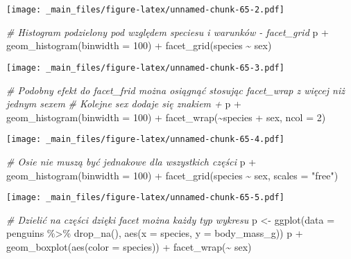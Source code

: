 \documentclass[
]{book}
\newenvironment{Shaded}{\begin{snugshade}}{\end{snugshade}}
\newcommand{\AttributeTok}[1]{\textcolor[rgb]{0.77,0.63,0.00}{#1}}
\newcommand{\CommentTok}[1]{\textcolor[rgb]{0.56,0.35,0.01}{\textit{#1}}}
\newcommand{\DecValTok}[1]{\textcolor[rgb]{0.00,0.00,0.81}{#1}}
\newcommand{\FunctionTok}[1]{\textcolor[rgb]{0.00,0.00,0.00}{#1}}
\newcommand{\NormalTok}[1]{#1}
\newcommand{\OtherTok}[1]{\textcolor[rgb]{0.56,0.35,0.01}{#1}}
\newcommand{\SpecialCharTok}[1]{\textcolor[rgb]{0.00,0.00,0.00}{#1}}
\newcommand{\StringTok}[1]{\textcolor[rgb]{0.31,0.60,0.02}{#1}}
\begin{document}
\texttt{[image: \_main\_files/figure-latex/unnamed-chunk-65-2.pdf]}

\begin{Shaded}
\begin{Highlighting}[]
\CommentTok{\# Histogram podzielony pod względem speciesu i warunków {-} facet\_grid}
\NormalTok{p }\SpecialCharTok{+} \FunctionTok{geom\_histogram}\NormalTok{(}\AttributeTok{binwidth =} \DecValTok{100}\NormalTok{) }\SpecialCharTok{+} \FunctionTok{facet\_grid}\NormalTok{(species }\SpecialCharTok{\textasciitilde{}}\NormalTok{ sex)}
\end{Highlighting}
\end{Shaded}

\texttt{[image: \_main\_files/figure-latex/unnamed-chunk-65-3.pdf]}

\begin{Shaded}
\begin{Highlighting}[]
\CommentTok{\# Podobny efekt do facet\_frid można osiągnąć stosując facet\_wrap z więcej niż jednym sexem}
\CommentTok{\# Kolejne sex dodaje się znakiem +}
\NormalTok{p }\SpecialCharTok{+} \FunctionTok{geom\_histogram}\NormalTok{(}\AttributeTok{binwidth =} \DecValTok{100}\NormalTok{) }\SpecialCharTok{+} \FunctionTok{facet\_wrap}\NormalTok{(}\SpecialCharTok{\textasciitilde{}}\NormalTok{species }\SpecialCharTok{+}\NormalTok{ sex, }\AttributeTok{ncol =} \DecValTok{2}\NormalTok{)}
\end{Highlighting}
\end{Shaded}

\texttt{[image: \_main\_files/figure-latex/unnamed-chunk-65-4.pdf]}

\begin{Shaded}
\begin{Highlighting}[]
\CommentTok{\# Osie nie muszą być jednakowe dla wszystkich części}
\NormalTok{p }\SpecialCharTok{+} \FunctionTok{geom\_histogram}\NormalTok{(}\AttributeTok{binwidth =} \DecValTok{100}\NormalTok{) }\SpecialCharTok{+} \FunctionTok{facet\_grid}\NormalTok{(species }\SpecialCharTok{\textasciitilde{}}\NormalTok{ sex, }\AttributeTok{scales =} \StringTok{"free"}\NormalTok{)}
\end{Highlighting}
\end{Shaded}

\texttt{[image: \_main\_files/figure-latex/unnamed-chunk-65-5.pdf]}

\begin{Shaded}
\begin{Highlighting}[]
\CommentTok{\# Dzielić na części dzięki facet można każdy typ wykresu}
\NormalTok{p }\OtherTok{\textless{}{-}} \FunctionTok{ggplot}\NormalTok{(}\AttributeTok{data =}\NormalTok{ penguins }\SpecialCharTok{\%\textgreater{}\%} \FunctionTok{drop\_na}\NormalTok{(), }\FunctionTok{aes}\NormalTok{(}\AttributeTok{x =}\NormalTok{ species, }\AttributeTok{y =}\NormalTok{ body\_mass\_g))}
\NormalTok{p }\SpecialCharTok{+} \FunctionTok{geom\_boxplot}\NormalTok{(}\FunctionTok{aes}\NormalTok{(}\AttributeTok{color =}\NormalTok{ species)) }\SpecialCharTok{+} \FunctionTok{facet\_wrap}\NormalTok{(}\SpecialCharTok{\textasciitilde{}}\NormalTok{ sex)}
\end{Highlighting}
\end{Shaded}
\end{document}
